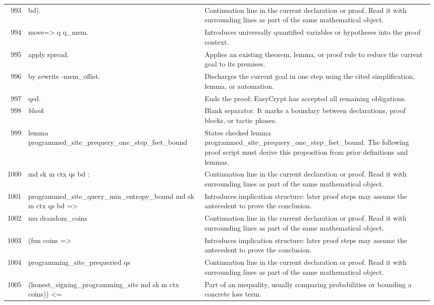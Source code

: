\documentclass[10pt]{article}
\begin{document}
\begin{longtable}{r L{0.53\textwidth} L{0.37\textwidth}}
993 & {\ttfamily\scriptsize         bd).} & Continuation line in the current declaration or proof.  Read it with surrounding lines as part of the same mathematical object. \\
994 & {\ttfamily\scriptsize move=> q q\_mem.} & Introduces universally quantified variables or hypotheses into the proof context. \\
995 & {\ttfamily\scriptsize apply spread.} & Applies an existing theorem, lemma, or proof rule to reduce the current goal to its premises. \\
996 & {\ttfamily\scriptsize by rewrite -mem\_oflist.} & Discharges the current goal in one step using the cited simplification, lemma, or automation. \\
997 & {\ttfamily\scriptsize qed.} & Ends the proof; EasyCrypt has accepted all remaining obligations. \\
998 & {\ttfamily\scriptsize \emph{blank}} & Blank separator.  It marks a boundary between declarations, proof blocks, or tactic phases. \\
999 & {\ttfamily\scriptsize lemma programmed\_site\_prequery\_one\_step\_fset\_bound} & States checked lemma programmed\_site\_prequery\_one\_step\_fset\_bound.  The following proof script must derive this proposition from prior definitions and lemmas. \\
1000 & {\ttfamily\scriptsize   md sk m ctx qs bd :} & Continuation line in the current declaration or proof.  Read it with surrounding lines as part of the same mathematical object. \\
1001 & {\ttfamily\scriptsize   programmed\_site\_query\_min\_entropy\_bound md sk m ctx qs bd =>} & Introduces implication structure: later proof steps may assume the antecedent to prove the conclusion. \\
1002 & {\ttfamily\scriptsize   mu drandom\_coins} & Continuation line in the current declaration or proof.  Read it with surrounding lines as part of the same mathematical object. \\
1003 & {\ttfamily\scriptsize     (fun coins =>} & Introduces implication structure: later proof steps may assume the antecedent to prove the conclusion. \\
1004 & {\ttfamily\scriptsize       programming\_site\_prequeried qs} & Continuation line in the current declaration or proof.  Read it with surrounding lines as part of the same mathematical object. \\
1005 & {\ttfamily\scriptsize         (honest\_signing\_programming\_site md sk m ctx coins)) <=} & Part of an inequality, usually comparing probabilities or bounding a concrete loss term. \\

\end{longtable}
\end{document}
